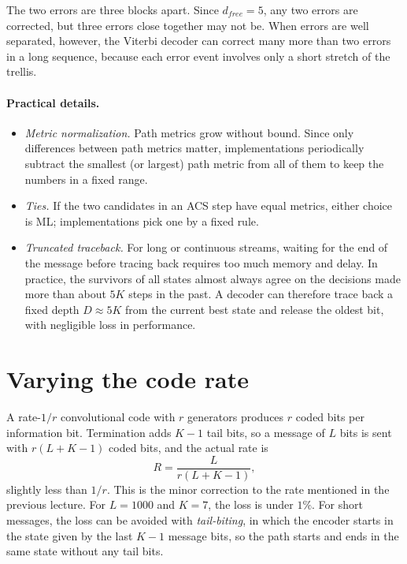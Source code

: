 \begin{example}
The two errors are three blocks apart. Since \(d_{free} = 5\), any two errors are corrected, but three errors close together may not be. When errors are well separated, however, the Viterbi decoder can correct many more than two errors in a long sequence, because each error event involves only a short stretch of the trellis.
\end{example}

\paragraph{Practical details.}
\begin{itemize}
    \item \emph{Metric normalization.} Path metrics grow without bound. Since only differences between path metrics matter, implementations periodically subtract the smallest (or largest) path metric from all of them to keep the numbers in a fixed range.
    \item \emph{Ties.} If the two candidates in an ACS step have equal metrics, either choice is ML; implementations pick one by a fixed rule.
    \item \emph{Truncated traceback.} For long or continuous streams, waiting for the end of the message before tracing back requires too much memory and delay. In practice, the survivors of all states almost always agree on the decisions made more than about \(5K\) steps in the past. A decoder can therefore trace back a fixed depth \(D \approx 5K\) from the current best state and release the oldest bit, with negligible loss in performance.
\end{itemize}

\section{Varying the code rate}\label{sec:rate}
A rate-\(1/r\) convolutional code with \(r\) generators produces \(r\) coded bits per information bit. Termination adds \(K-1\) tail bits, so a message of \(L\) bits is sent with \(r(L + K - 1)\) coded bits, and the actual rate is
\[R = \frac{L}{r(L+K-1)},\]
slightly less than \(1/r\). This is the minor correction to the rate mentioned in the previous lecture. For \(L = 1000\) and \(K = 7\), the loss is under \(1\%\). For short messages, the loss can be avoided with \emph{tail-biting}, in which the encoder starts in the state given by the last \(K-1\) message bits, so the path starts and ends in the same state without any tail bits.

